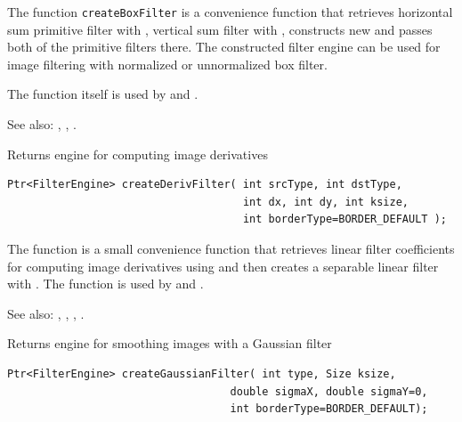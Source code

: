 The function \texttt{createBoxFilter} is a convenience function that retrieves horizontal sum primitive filter with , vertical sum filter with , constructs new  and passes both of the primitive filters there. The constructed filter engine can be used for image filtering with normalized or unnormalized box filter.

The function itself is used by  and .

See also: , , .

\label{createDerivFilter}
Returns engine for computing image derivatives 

\begin{lstlisting}
Ptr<FilterEngine> createDerivFilter( int srcType, int dstType,
                                     int dx, int dy, int ksize,
                                     int borderType=BORDER_DEFAULT );
\end{lstlisting}
\begin{description}
\end{description}

The function  is a small convenience function that retrieves linear filter coefficients for computing image derivatives using  and then creates a separable linear filter with . The function is used by  and .

See also: , , , .

\label{createGaussianFilter}
Returns engine for smoothing images with a Gaussian filter

\begin{lstlisting}
Ptr<FilterEngine> createGaussianFilter( int type, Size ksize,
                                   double sigmaX, double sigmaY=0,
                                   int borderType=BORDER_DEFAULT);
\end{lstlisting}
\begin{description}
\end{description}


